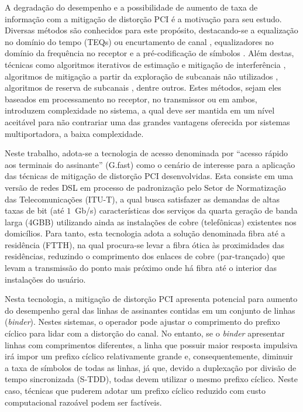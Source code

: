 A degradação do desempenho e a possibilidade de aumento de taxa de informação com a mitigação de distorção PCI é a motivação para seu estudo. Diversas métodos são conhecidos para este propósito, destacando-se a equalização no domínio do tempo (TEQs) ou encurtamento de canal \cite{chanshort2001,channelshort2003}, equalizadores no domínio da frequência no receptor \cite{Trautmann2002, Park04} e a pré-codificação de símbolos \cite{Malkin08,Cheong98}. Além destas, técnicas como algoritmos iterativos de estimação e mitigação de interferência \cite{stuber1998}, algoritmos de mitigação a partir da exploração de subcanais não utilizados \cite{huang2009}, algoritmos de reserva de subcanais \cite{malkin2007}, dentre outros. Estes métodos, sejam eles baseados em processamento no receptor, no transmissor ou em ambos, introduzem complexidade no sistema, a qual deve ser mantida em um nível aceitável para não contrariar uma das grandes vantagens oferecida por sistemas multiportadora, a baixa complexidade.

Neste trabalho, adota-se a tecnologia de acesso denominada por ``acesso rápido aos terminais do assinante'' (G.fast) \cite{maes2012} como o cenário de interesse para a aplicação das técnicas de mitigação de distorção PCI desenvolvidas. Esta consiste em uma versão de redes DSL em processo de padronização pelo Setor de Normatização das Telecomunicações (ITU-T), a qual busca satisfazer as demandas de altas taxas de bit (até $1$~Gb/s) características dos serviços da quarta geração de banda larga (4GBB) \cite{tno_gfast} utilizando ainda as instalações de cobre (telefônicas) existentes nos domicílios. Para tanto, esta tecnologia adota a solução denominada fibra até a residência (FTTH), na qual procura-se levar a fibra ótica às proximidades das residências, reduzindo o comprimento dos enlaces de cobre (par-trançado) que levam a transmissão do ponto mais próximo onde há fibra até o interior das instalações do usuário.

Nesta tecnologia, a mitigação de distorção PCI apresenta potencial para aumento do desempenho geral das linhas de assinantes contidas em um conjunto de linhas (\textsl{binder}). Nestes sistemas, o operador pode ajustar o comprimento do prefixo cíclico para lidar com a distorção do canal. No entanto, se o \textsl{binder} apresentar linhas com comprimentos diferentes, a linha que possuir maior resposta impulsiva irá impor um prefixo cíclico relativamente grande e, consequentemente, diminuir a taxa de símbolos de todas as linhas, já que, devido a duplexação por divisão de tempo sincronizada (S-TDD), todas devem utilizar o mesmo prefixo cíclico. Neste caso, técnicas que puderem adotar um prefixo cíclico reduzido com custo computacional razoável podem ser factíveis.

